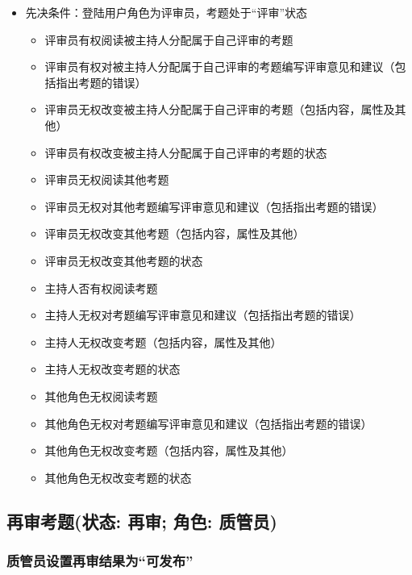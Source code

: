 \documentclass[hyperref, a4paper]{ctexart}
\providecommand{\tightlist}{%
  \setlength{\itemsep}{0pt}\setlength{\parskip}{0pt}}
\begin{document}
\begin{itemize}
\tightlist
\item
  先决条件：登陆用户角色为评审员，考题处于``评审''状态

  \begin{itemize}
  \tightlist
  \item
    评审员有权阅读被主持人分配属于自己评审的考题
  \item
    评审员有权对被主持人分配属于自己评审的考题编写评审意见和建议（包括指出考题的错误）
  \item
    评审员无权改变被主持人分配属于自己评审的考题（包括内容，属性及其他）
  \item
    评审员有权改变被主持人分配属于自己评审的考题的状态
  \item
    评审员无权阅读其他考题
  \item
    评审员无权对其他考题编写评审意见和建议（包括指出考题的错误）
  \item
    评审员无权改变其他考题（包括内容，属性及其他）
  \item
    评审员无权改变其他考题的状态
  \item
    主持人否有权阅读考题
  \item
    主持人无权对考题编写评审意见和建议（包括指出考题的错误）
  \item
    主持人无权改变考题（包括内容，属性及其他）
  \item
    主持人无权改变考题的状态
  \item
    其他角色无权阅读考题
  \item
    其他角色无权对考题编写评审意见和建议（包括指出考题的错误）
  \item
    其他角色无权改变考题（包括内容，属性及其他）
  \item
    其他角色无权改变考题的状态
  \end{itemize}
\end{itemize}

\hypertarget{ux518dux5ba1ux8003ux9898ux72b6ux6001-ux518dux5ba1-ux89d2ux8272-ux8d28ux7ba1ux5458}{%
\subsection{再审考题(状态: 再审; 角色:
质管员)}\label{ux518dux5ba1ux8003ux9898ux72b6ux6001-ux518dux5ba1-ux89d2ux8272-ux8d28ux7ba1ux5458}}

\hypertarget{ux8d28ux7ba1ux5458ux8bbeux7f6eux518dux5ba1ux7ed3ux679cux4e3aux53efux53d1ux5e03}{%
\subsubsection{质管员设置再审结果为``可发布''}\label{ux8d28ux7ba1ux5458ux8bbeux7f6eux518dux5ba1ux7ed3ux679cux4e3aux53efux53d1ux5e03}}
\end{document}
